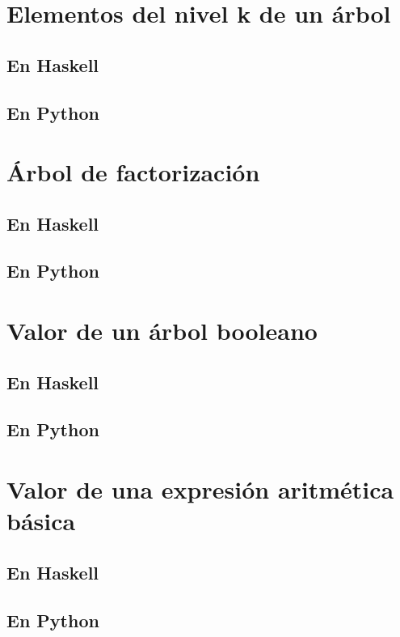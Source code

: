 \documentclass[a4paper,12pt,twoside]{book}
\begin{document}
\section{Elementos del nivel k de un árbol}
\subsection{En Haskell}
\subsection{En Python}

\section{Árbol de factorización}
\subsection{En Haskell}
\subsection{En Python}

\section{Valor de un árbol booleano}
\subsection{En Haskell}
\subsection{En Python}

\section{Valor de una expresión aritmética básica}
\subsection{En Haskell}
\subsection{En Python}
\end{document}

